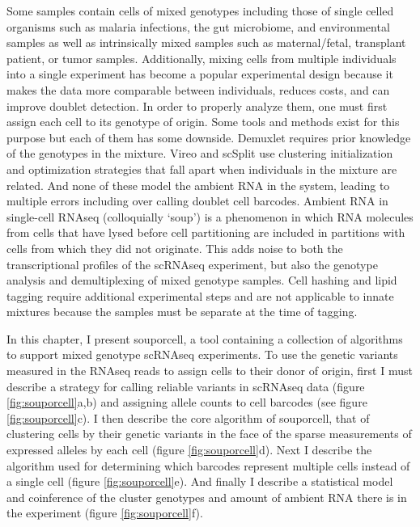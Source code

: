 \par{
Some samples contain cells of mixed genotypes including those of single celled organisms such as malaria infections, 
the gut microbiome, and environmental samples as well 
as intrinsically mixed samples such as maternal/fetal, transplant patient, or tumor samples.
Additionally, mixing cells from multiple individuals into a single experiment has become a popular experimental design because it makes the data more comparable between individuals, reduces costs, and can improve doublet detection. 
 In order to properly 
analyze them, one must first assign each cell to its genotype of origin. Some tools and methods exist for this purpose\cite{demuxlet}\cite{cellhashing}\cite{scsplit} 
but each of them has some downside. Demuxlet requires prior knowledge of the genotypes in the mixture. Vireo and scSplit use clustering initialization and optimization strategies that fall apart when individuals in the mixture are related. And none of these model the ambient RNA in the system, leading to multiple errors including over calling doublet cell barcodes. Ambient RNA in single-cell RNAseq (colloquially `soup') is a phenomenon in which RNA molecules from cells that have lysed before cell partitioning are included in partitions with cells from which they did not originate\cite{soupx}. This adds noise to both the transcriptional profiles of the scRNAseq experiment, but also the genotype analysis and demultiplexing of mixed genotype samples. Cell hashing and lipid tagging require additional experimental steps and are not applicable to innate mixtures because the samples must be separate at the time of tagging. 

} 

\par{
In this chapter, I present souporcell, a tool containing a collection of algorithms to support mixed genotype scRNAseq experiments\cite{souporcell}. 
To use the genetic variants measured in the RNAseq reads to assign cells to their donor of origin, first I must describe a strategy for calling reliable variants in scRNAseq data (figure \ref{fig:souporcell}a,b) and assigning allele counts to cell barcodes (see figure \ref{fig:souporcell}c). I then describe the core algorithm of souporcell, that of clustering cells by their genetic variants in the face of the sparse measurements of expressed alleles by each cell (figure \ref{fig:souporcell}d). Next I describe the algorithm used for determining which barcodes represent multiple cells instead of a single cell (figure \ref{fig:souporcell}e). And finally I describe a statistical model and coinference of the cluster genotypes and amount of ambient RNA there is in the experiment (figure \ref{fig:souporcell}f). 
}


